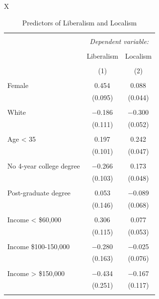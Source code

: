 \documentclass[article,11pt]{memoir}
\begin{document}
\begin{table}
  \caption{Predictors of Liberalism and Localism}
  \label{tab:e_lib_loc_regression}
  \begin{threeparttable}
  \footnotesize
  \begin{tabularx}{\linewidth}{X}
  \centering

  \begin{tabular}{@{\extracolsep{5pt}}lcc} 
  \\[-1.8ex]\hline 
  \hline \\[-1.8ex] 
   & \multicolumn{2}{c}{\textit{Dependent variable:}} \\ 
  \cline{2-3} 
  \\[-1.8ex] & Liberalism & Localism \\ 
  \\[-1.8ex] & (1) & (2)\\ 
  \hline \\[-1.8ex] 
   Female & 0.454$^{}$ & 0.088$^{}$ \\ 
    & (0.095) & (0.044) \\ 
    & & \\ 
   White & $-$0.186$^{}$ & $-$0.300$^{}$ \\ 
    & (0.111) & (0.052) \\ 
    & & \\ 
   Age < 35 & 0.197$^{}$ & 0.242$^{}$ \\ 
    & (0.101) & (0.047) \\ 
    & & \\ 
   No 4-year college degree & $-$0.266$^{}$ & 0.173$^{}$ \\ 
    & (0.103) & (0.048) \\ 
    & & \\ 
   Post-graduate degree & 0.053 & $-$0.089 \\ 
    & (0.146) & (0.068) \\ 
    & & \\ 
   Income < \$60,000 & 0.306$^{}$ & 0.077 \\ 
    & (0.115) & (0.053) \\ 
    & & \\ 
   Income \$100-150,000 & $-$0.280$^{}$ & $-$0.025 \\ 
    & (0.163) & (0.076) \\ 
    & & \\ 
   Income > \$150,000 & $-$0.434$^{}$ & $-$0.167 \\ 
    & (0.251) & (0.117) \\ 
    & & \\ 

\end{tabular}
\end{tabularx}
\end{threeparttable}
\end{table}
\end{document}
